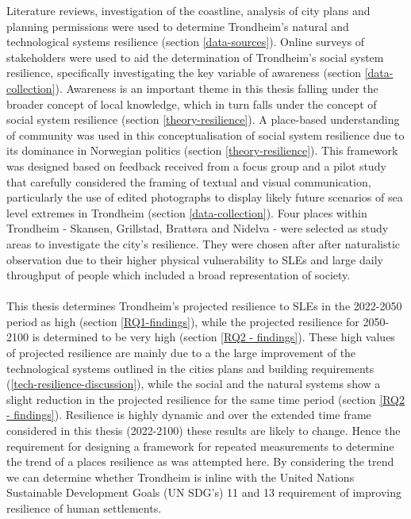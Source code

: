 Literature reviews, investigation of the coastline, analysis of city plans and planning permissions were used to determine Trondheim's natural and technological systems resilience (section \ref{data-sources}). Online surveys of stakeholders were used to aid the determination of Trondheim's social system resilience, specifically investigating the key variable of awareness (section \ref{data-collection}). Awareness is an important theme in this thesis falling under the broader concept of local knowledge, which in turn falls under the concept of social system resilience (section \ref{theory-resilience}). A place-based understanding of community was used in this conceptualisation of social system resilience due to its dominance in Norwegian politics (section \ref{theory-resilience}). This framework was designed based on feedback received from a focus group and a pilot study that carefully considered the framing of textual and visual communication, particularly the use of edited photographs to display likely future scenarios of sea level extremes in Trondheim (section \ref{data-collection}). Four places within Trondheim - Skansen, Grillstad, Brattøra and Nidelva - were selected as study areas to investigate the city's resilience. They were chosen after after naturalistic observation due to their higher physical vulnerability to SLEs and large daily throughput of people which included a broad representation of society.

\paragraph{}
This thesis determines Trondheim's projected resilience to SLEs in the 2022-2050 period as high (section \ref{RQ1-findings}), while the projected resilience for 2050-2100 is determined to be very high (section \ref{RQ2 - findings}). These high values of projected resilience are mainly due to a the large improvement of the technological systems outlined in the cities plans and building requirements (\ref{tech-resilience-discussion}), while the social and the natural systems show a slight reduction  in the projected resilience for the same time period (section \ref{RQ2 - findings}). Resilience is highly dynamic and over the extended time frame considered in this thesis (2022-2100) these results are likely to change. Hence the requirement for designing a framework for repeated measurements to determine the trend of a places resilience as was attempted here. By considering the trend we can determine whether Trondheim is inline with the United Nations Sustainable Development Goals (UN SDG’s) 11 and 13 requirement of improving resilience of human settlements.

